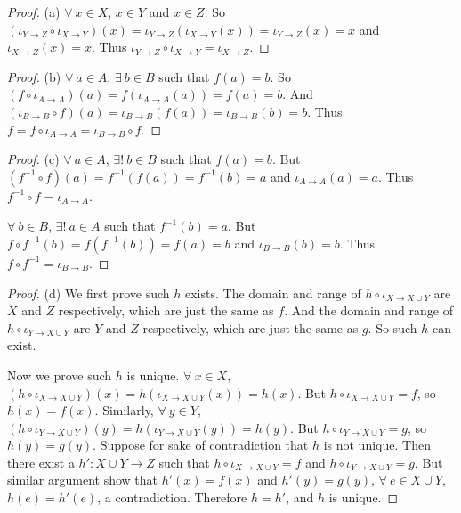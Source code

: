 \begin{proof}{(a)}
\(\forall\ x \in X\), \(x \in Y\) and \(x \in Z\).
So \((\iota_{Y \to Z} \circ \iota_{X \to Y})(x) = \iota_{Y \to Z}(\iota_{X \to Y}(x)) = \iota_{Y \to Z}(x) = x\) and \(\iota_{X \to Z}(x) = x\).
Thus \(\iota_{Y \to Z} \circ \iota_{X \to Y} = \iota_{X \to Z}\).
\end{proof}

\begin{proof}{(b)}
\(\forall\ a \in A\), \(\exists\ b \in B\) such that \(f(a) = b\).
So \((f \circ \iota_{A \to A})(a) = f(\iota_{A \to A}(a)) = f(a) = b\).
And \((\iota_{B \to B} \circ f)(a) = \iota_{B \to B}(f(a)) = \iota_{B \to B}(b) = b\).
Thus \(f = f \circ \iota_{A \to A} = \iota_{B \to B} \circ f\).
\end{proof}

\begin{proof}{(c)}
\(\forall\ a \in A\), \(\exists!\ b \in B\) such that \(f(a) = b\).
But \((f^{-1} \circ f)(a) = f^{-1}(f(a)) = f^{-1}(b) = a\) and \(\iota_{A \to A}(a) = a\).
Thus \(f^{-1} \circ f = \iota_{A \to A}\).

\(\forall\ b \in B\), \(\exists!\ a \in A\) such that \(f^{-1}(b) = a\).
But \(f \circ f^{-1}(b) = f(f^{-1}(b)) = f(a) = b\) and \(\iota_{B \to B}(b) = b\).
Thus \(f \circ f^{-1} = \iota_{B \to B}\).
\end{proof}

\begin{proof}{(d)}
We first prove such \(h\) exists.
The domain and range of \(h \circ \iota_{X \to X \cup Y}\) are \(X\) and \(Z\) respectively, which are just the same as \(f\).
And the domain and range of \(h \circ \iota_{Y \to X \cup Y}\) are \(Y\) and \(Z\) respectively, which are just the same as \(g\).
So such \(h\) can exist.

Now we prove such \(h\) is unique.
\(\forall\ x \in X\), \((h \circ \iota_{X \to X \cup Y})(x) = h(\iota_{X \to X \cup Y}(x)) = h(x)\).
But \(h \circ \iota_{X \to X \cup Y} = f\), so \(h(x) = f(x)\).
Similarly, \(\forall\ y \in Y\), \((h \circ \iota_{Y \to X \cup Y})(y) = h(\iota_{Y \to X \cup Y}(y)) = h(y)\).
But \(h \circ \iota_{Y \to X \cup Y} = g\), so \(h(y) = g(y)\).
Suppose for sake of contradiction that \(h\) is not unique.
Then there exist a \(h': X \cup Y \to Z\) such that \(h \circ \iota_{X \to X \cup Y} = f\) and \(h \circ \iota_{Y \to X \cup Y} = g\).
But similar argument show that \(h'(x) = f(x)\) and \(h'(y) = g(y)\), \(\forall\ e \in X \cup Y\), \(h(e) = h'(e)\), a contradiction.
Therefore \(h = h'\), and \(h\) is unique.
\end{proof}


